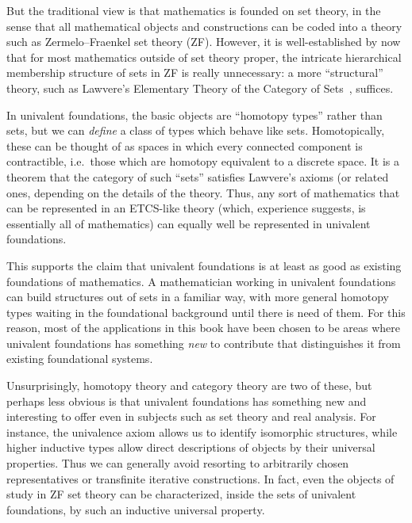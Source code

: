 But the traditional view is that mathematics is founded on set theory, in the sense that all mathematical objects and constructions can be coded into a theory such as Zermelo--Fraenkel set theory (ZF).
%
%
%
%
However, it is well-established by now that for most mathematics outside of set theory proper, the intricate hierarchical membership structure of sets in ZF is really unnecessary: a more ``structural'' theory, such as Lawvere's Elementary Theory of the Category of Sets~\cite{lawvere:etcs-long}, suffices.
%

In univalent foundations, the basic objects are ``homotopy types'' rather than sets, but we can \emph{define} a class of types which behave like sets.
Homotopically, these can be thought of as spaces in which every connected component is contractible, i.e.\ those which are homotopy equivalent to a discrete space.
%
It is a theorem  that the category of such ``sets'' satisfies Lawvere's axioms (or related ones, depending on the details of the theory.
Thus, any sort of mathematics that can be represented in an ETCS-like theory (which, experience suggests, is essentially all of mathematics) can equally well be represented in univalent foundations.  

This supports the claim that univalent foundations is at least as good as existing foundations of mathematics.
A mathematician working in univalent foundations can build structures out of sets in a familiar way, with more general homotopy types waiting in the foundational background until there is need of them.
For this reason, most of the applications in this book have been chosen to be areas where univalent foundations has something \emph{new} to contribute that distinguishes it from existing foundational systems.

Unsurprisingly, homotopy theory and category theory are two of these, but perhaps less obvious is that univalent foundations has something new and interesting to offer even in subjects such as set theory and real analysis.
For instance, the univalence axiom allows us to identify isomorphic structures, while higher inductive types allow direct descriptions of objects by their universal properties.
Thus we can generally avoid resorting to arbitrarily chosen representatives or transfinite iterative constructions.
In fact, even the objects of study in ZF set theory can be characterized, inside the sets of univalent foundations, by such an inductive universal property.

